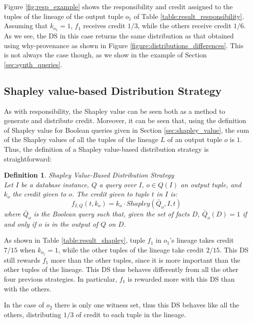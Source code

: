 \documentclass[preprint,12pt,sort&compress]{elsarticle}
\newcommand{\rtwo}[1]{\textcolor{reviewer2}{#1}}
\newtheorem{definition}{Definition}[section]
\begin{document}
Figure \ref{fig:resp_example} shows the responsibility and credit assigned to the tuples of the lineage of the output tuple $o_1$ of Table \ref{table:result_responsibility}. 
Assuming that $k_{o_1} = 1$, $f_1$ receives credit $1/3$, while the others receive credit $1/6$. 
As we see, the DS in this case returns the same distribution as that obtained using why-provenance as shown in Figure \ref{figure:distributions_differences}.
This is not always the case though, as we show in the example of Section \ref{sec:synth_queries}.

\rtwo{\subsection{Shapley value-based Distribution Strategy}}

As with responsibility, the Shapley value can be seen both as a method to generate and distribute credit. Moreover, it can be seen that, using the definition of Shapley value for Boolean queries given in Section \ref{sec:shapley_value}, the sum of the Shapley values of all the tuples of the lineage $L$ of an output tuple $o$ is $1$. Thus, the definition of a Shapley value-based distribution strategy is straightforward:

\begin{definition}{Shapley Value-Based Distribution Strategy} \\
	Let $I$ be a database instance, $Q$ a query over $I$, $o \in Q(I)$ an output tuple, and $k_o$ the credit given to $o$. The credit given to tuple $t$ in $I$ is:
	\[
		f_{I, Q}(t, k_o) = k_o \cdot 
		Shapley(\bar{Q}_o, I, t)
	\] 
	where $\bar{Q}_o$ is the Boolean query such that, given the set of facts $D$, $\bar{Q}_o(D) = 1$ if and only if $o$ is in the output of $Q$ on $D$.
\end{definition}

As shown in Table \ref{table:result_shapley}, tuple $f_1$ in $o_1$'s lineage takes credit $7/15$ when $k_{o_1} = 1$, while the other tuples of the lineage take credit $2/15$. This DS still rewards $f_1$ more than the other tuples, since it is more important than the other tuples of the lineage. This DS thus behaves differently from all the other four previous strategies. In particular, $f_1$ is rewarded more with this DS than with the others.

In the case of $o_2$ there is only one witness set, thus this DS behaves like all the others, distributing $1/3$ of credit to each tuple in the lineage. 
\end{document}
